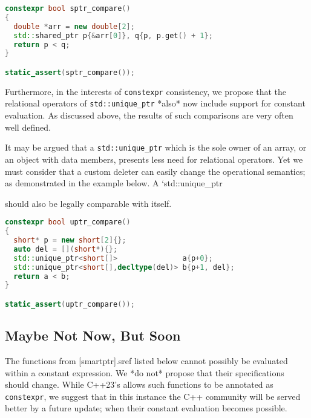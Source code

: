 \documentclass[11pt]{article}
\begin{document}
{{{{{{{{{{{\begin{lstlisting}[language=cpp]
constexpr bool sptr_compare()
{
  double *arr = new double[2];
  std::shared_ptr p{&arr[0]}, q{p, p.get() + 1};
  return p < q;
}

static_assert(sptr_compare());
\end{lstlisting}

Furthermore, in the interests of \texttt{constexpr} consistency, we propose that
the relational operators of \texttt{std::unique_ptr} *also* now include support
for constant evaluation. As discussed above, the results of such comparisons
are very often well defined.

It may be argued that a \texttt{std::unique_ptr} which is the sole owner of an
array, or an object with data members, presents less need for relational
operators. Yet we must consider that a custom deleter can easily change the
operational semantics; as demonstrated in the example below. A
`std::unique_ptr} should also be legally comparable with itself.

\begin{lstlisting}[language=cpp]
constexpr bool uptr_compare()
{
  short* p = new short[2]{};
  auto del = [](short*){};
  std::unique_ptr<short[]>               a{p+0};
  std::unique_ptr<short[],decltype(del)> b{p+1, del};
  return a < b;
}

static_assert(uptr_compare());
\end{lstlisting}

\subsection{Maybe Not Now, But Soon}

The functions from [smartptr]{.sref} listed below cannot possibly be evaluated
within a constant expression. We *do not* propose that their specifications
should change. While C++23's \cite{P2448R2} allows such functions to be annotated
as \texttt{constexpr}, we suggest that in this instance the C++ community will
be served better by a future update; when their constant evaluation becomes
possible.

}}}}}}}}}}
\end{document}
